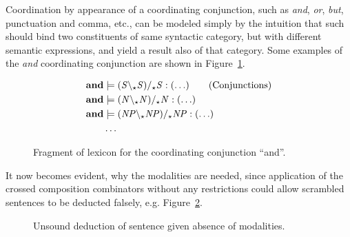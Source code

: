 Coordination by appearance of a coordinating conjunction, such as \emph{and}, \emph{or}, \emph{but}, punctuation and comma, etc., can be modeled simply by the intuition that such should bind two constituents of same syntactic category, but with different semantic expressions, and yield a result also of that category. Some examples of the \emph{and} coordinating conjunction are shown in Figure~\ref{fig:conjunctionLex}.

\begin{figure}[ht]
\vspace{-1.5em}
\begin{align*}
  \mathbf{and}       &\models ({\mathit{S}} \backslash_\star {\mathit{S}}) /_\star {\mathit{S}}    : (\ldots)    \tag{Conjunctions} \\
  \mathbf{and}       &\models ({\mathit{N}} \backslash_\star {\mathit{N}}) /_\star {\mathit{N}}    : (\ldots)     \\
  \mathbf{and}       &\models ({\mathit{NP}} \backslash_\star {\mathit{NP}}) /_\star {\mathit{NP}} : (\ldots)  \\
  &\hdots 
\end{align*}
\vspace{-1.5em}
\caption{Fragment of lexicon for the coordinating conjunction ``and''.}
\label{fig:conjunctionLex}
\end{figure}

It now becomes evident, why the modalities are needed, since application of the crossed composition combinators without any restrictions could allow scrambled sentences to be deducted falsely, e.g. Figure~\ref{fig:withoutModalities}. 
\begin{figure}[ht]
\vspace{1em}
\center
{}
\caption{Unsound deduction of sentence given absence of modalities.}
\label{fig:withoutModalities}
\vspace{1em}
\end{figure}

